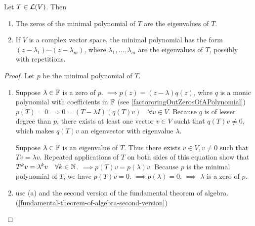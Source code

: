 \setcounter{thm}{26}
\begin{thm}
  \label{zeros-of-the-minimal-polynomial-of-T-are-the-eigenvalues-of-T}
  Let $T \in \mathcal{L}(V)$. Then
  \begin{enumerate}[label=(\alph*)]
    \item The zeros of the minimal polynomial of $T$ are the eigenvalues of $T$.
    \item If $V$ is a complex vector space, the minimal polynomial has the form $(z-\lambda_1)\cdots(z-\lambda_m)$, where $\lambda_1, \dots, \lambda_m$ are the eigenvalues of $T$, possibly with repetitions.
  \end{enumerate}
\end{thm}
\begin{proof} Let $p$ be the minimal polynomial of $T$.
  \begin{enumerate}[label=(\alph*)]
    \item Suppose $\lambda \in \mathbb{F}$ is a zero of $p$. $\implies p(z)=(z-\lambda)q(z)$, whre $q$ is a monic polynomial with coefficients in $\mathbb{F}$ (see \ref{factororingOutZerosOfAPolynomial}) \\
    $p(T)=0\implies 0=(T-\lambda I)(q(T)v) \quad \forall v\in V.$
    Because $q$ is of lesser degree than $p$, there exists at least one vector $v\in V$ sucht that $q(T)v \neq 0$, which makes $q(T)v$ an eigenvector with eigenvalue $\lambda$.

    Suppose $\lambda \in \mathbb{F}$ is an eigenvalue of $T$. Thus there exists $v\in V, v \neq 0$ such that $Tv=\lambda v$. Repeated applications of $T$ on both sides of this equation show that $T^kv =\lambda^k v \quad \forall k\in \mathbb{N}$.
    $\implies p(T)v=p(\lambda)v$. Because $p$ is the minimal polynomial of $T$, we have $p(T)v=0$. $\implies p(\lambda) = 0$. $\implies$ $\lambda$ is a zero of $p$.

    \item use (a) and the second version of the fundamental theorem of algebra. (\ref{fundamental-theorem-of-algebra-second-version})
  \end{enumerate}
\end{proof}

